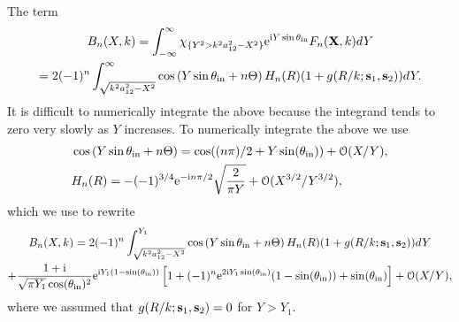 \documentclass[12pt, a4paper]{article}
\begin{document}
The term
\begin{multline}
  B_n(X,k) = \int_{-\infty}^{\infty} \chi_{\{ Y^2> k^2 a_{12}^2 - X^2\}} \textrm{e}^{\textrm{i} Y \sin\theta_{\mathrm{in}}}
   F_{n}(\mathbf X,k) d Y
  \\
  = 2(-1)^{n} \int_{\sqrt{k^2 a_{12}^2 - X^2}}^\infty \cos \left( Y \sin\theta_{\mathrm{in}} +  n \Theta\right) H_{n}(R)( 1 + g(R/k;  \mathbf s_1,\mathbf s_2)) d Y.
\end{multline}
It is difficult to numerically integrate the above because the integrand tends to zero very slowly as $Y$ increases. To numerically integrate the above we use
\begin{align}
  & \cos \left( Y \sin\theta_{\mathrm{in}} +  n \Theta\right) = \cos((n \pi)/2 + Y \sin(\theta_{\mathrm{in}})) + \mathcal O(X/Y),
  \\
  & H_{n}(R) =  -(-1)^{3/4} \textrm{e}^{-\textrm{i} n \pi /2} \sqrt{\frac{2}{\pi Y}} + \mathcal O(X^{3/2}/Y^{3/2}),
\end{align}
which we use to rewrite
\begin{multline}
  B_n(X,k) = 2(-1)^{n} \int_{\sqrt{k^2 a_{12}^2 - X^2}}^{Y_1} \cos \left( Y \sin\theta_{\mathrm{in}} +  n \Theta\right) H_{n}(R)( 1 + g(R/k;  \mathbf s_1,\mathbf s_2)) d Y
  \\ + \frac{1 + \textrm{i}}{\sqrt{\pi Y_1} \cos(\theta_{\mathrm{in}})^2} \textrm{e}^{\textrm{i}  Y_1 (1 - \sin(\theta_{\mathrm{in}}))}
  \left[ 1 + (-1)^n \textrm{e}^{2 \textrm{i} Y_1 \sin(\theta_{\mathrm{in}})} (1 - \sin(\theta_{\mathrm{in}})) + \sin(\theta_{\mathrm{in}}) \right] + \mathcal O(X/Y),
\end{multline}
where we assumed that $g(R/k;  \mathbf s_1,\mathbf s_2) =0$ for $Y>Y_1$.
\end{document}
